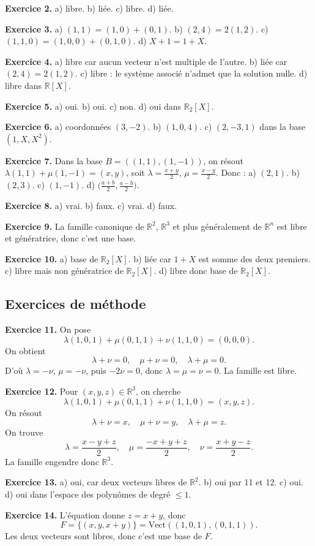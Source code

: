\documentclass[11pt,a4paper]{article}
\newcommand{\R}{\mathbb R}
\newcommand{\Vect}{\mathrm{Vect}}
\begin{document}
\textbf{Exercice 2.} a) libre. b) liée. c) libre. d) liée.

\textbf{Exercice 3.} a) $(1,1)=(1,0)+(0,1)$. b) $(2,4)=2(1,2)$. c) $(1,1,0)=(1,0,0)+(0,1,0)$. d) $X+1=1+X$.

\textbf{Exercice 4.} a) libre car aucun vecteur n'est multiple de l'autre. b) liée car $(2,4)=2(1,2)$. c) libre : le système associé n'admet que la solution nulle. d) libre dans $\R[X]$.

\textbf{Exercice 5.} a) oui. b) oui. c) non. d) oui dans $\R_2[X]$.

\textbf{Exercice 6.} a) coordonnées $(3,-2)$. b) $(1,0,4)$. c) $(2,-3,1)$ dans la base $(1,X,X^2)$.

\textbf{Exercice 7.} Dans la base $B=((1,1),(1,-1))$, on résout $\lambda(1,1)+\mu(1,-1)=(x,y)$, soit $\lambda=\frac{x+y}{2}$, $\mu=\frac{x-y}{2}$.
Donc : a) $(2,1)$. b) $(2,3)$. c) $(1,-1)$. d) $\big(\frac{a+b}{2},\frac{a-b}{2}\big)$.

\textbf{Exercice 8.} a) vrai. b) faux. c) vrai. d) faux.

\textbf{Exercice 9.} La famille canonique de $\R^2$, $\R^3$ et plus généralement de $\R^n$ est libre et génératrice, donc c'est une base.

\textbf{Exercice 10.} a) base de $\R_2[X]$. b) liée car $1+X$ est somme des deux premiers. c) libre mais non génératrice de $\R_2[X]$. d) libre donc base de $\R_2[X]$.

\subsection*{Exercices de méthode}
\textbf{Exercice 11.} On pose
\[\lambda(1,0,1)+\mu(0,1,1)+\nu(1,1,0)=(0,0,0).\]
On obtient
\[\lambda+\nu=0,\quad \mu+\nu=0,\quad \lambda+\mu=0.\]
D'où $\lambda=-\nu$, $\mu=-\nu$, puis $-2\nu=0$, donc $\lambda=\mu=\nu=0$. La famille est libre.

\textbf{Exercice 12.} Pour $(x,y,z)\in\R^3$, on cherche
\[\lambda(1,0,1)+\mu(0,1,1)+\nu(1,1,0)=(x,y,z).\]
On résout
\[\lambda+\nu=x,\quad \mu+\nu=y,\quad \lambda+\mu=z.\]
On trouve
\[\lambda=\frac{x-y+z}{2},\quad \mu=\frac{-x+y+z}{2},\quad \nu=\frac{x+y-z}{2}.\]
La famille engendre donc $\R^3$.

\textbf{Exercice 13.} a) oui, car deux vecteurs libres de $\R^2$. b) oui par 11 et 12. c) oui. d) oui dans l'espace des polynômes de degré $\le 1$.

\textbf{Exercice 14.} L'équation donne $z=x+y$, donc
\[F=\{(x,y,x+y)\}=\Vect((1,0,1),(0,1,1)).\]
Les deux vecteurs sont libres, donc c'est une base de $F$.
\end{document}
